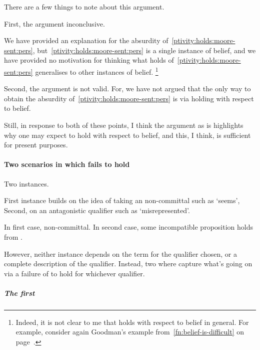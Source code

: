 \begin{note}
  There are a few things to note about this argument.

  First, the argument inconclusive.

  We have provided an explanation for the absurdity of~\ref{ptivity:holds:moore-sent:pers}, but~\ref{ptivity:holds:moore-sent:pers} is a single instance of belief, and we have provided no motivation for thinking what holds of~\ref{ptivity:holds:moore-sent:pers} generalises to other instances of belief.%
  \footnote{
    Indeed, it is not clear to me that \ptivity{} holds with respect to belief in general.
    For example, consider again Goodman's example from~\autoref{fn:belief-is-difficult} on page~\pageref{fn:belief-is-difficult}.
  }

  Second, the argument is not valid.
  For, we have not argued that the only way to obtain the absurdity of~\ref{ptivity:holds:moore-sent:pers} is via \ptivity{} holding with respect to belief.

  Still, in response to both of these points, I think the argument as is highlights why one may expect \ptivity{} to hold with respect to belief, and this, I think, is sufficient for present purposes.
  \end{note}

\paragraph[Failures of \ptivity{}]{Two scenarios in which \ptivity{} fails to hold}

\begin{note}
  Two instances.

  First instance builds on the idea of taking an non-committal such as `seems',
  Second, on an antagonistic qualifier such as `misrepresented'.

  In first case, non-committal.
  In second case, some incompatible proposition holds from \agpe{}.

  However, neither instance depends on the term for the qualifier chosen, or a complete description of the qualifier.
  Instead, two  where capture what's going on via a failure of \ptivity{} to hold for whichever qualifier.
\end{note}

\subparagraph{The first }

